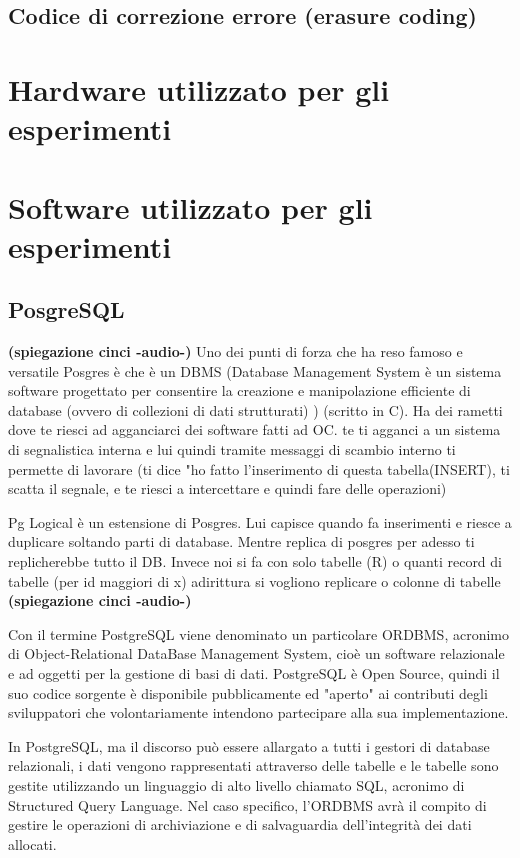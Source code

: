 \subsection{Codice di correzione errore (erasure coding)}
\item
\section{Hardware utilizzato per gli esperimenti}
\item
\section{Software utilizzato per gli esperimenti}
\item
\subsection{PosgreSQL}

\textbf{(spiegazione cinci -audio-)}
Uno dei punti di forza che ha reso famoso e versatile Posgres è che è un DBMS (Database Management System è un sistema software progettato per consentire la creazione e manipolazione efficiente di database (ovvero di collezioni di dati strutturati) ) (scritto in C). Ha dei rametti dove te riesci ad agganciarci dei software fatti ad OC. te ti agganci a un sistema di segnalistica interna e lui quindi tramite messaggi di scambio interno ti permette di lavorare (ti dice "ho fatto l'inserimento di questa tabella(INSERT), ti scatta il segnale, e te riesci a intercettare e quindi fare delle operazioni)

Pg Logical è un estensione di Posgres. Lui capisce quando fa inserimenti e riesce a duplicare soltando parti di database. Mentre replica di posgres per adesso ti replicherebbe tutto il DB. Invece noi si fa con solo tabelle (R) o quanti record di tabelle (per id maggiori di x) adirittura si vogliono replicare o colonne di tabelle \\
\textbf{(spiegazione cinci -audio-)}


Con il termine PostgreSQL viene denominato un particolare ORDBMS, acronimo di Object-Relational DataBase Management System, cioè un software relazionale e ad oggetti per la gestione di basi di dati.
PostgreSQL è Open Source, quindi il suo codice sorgente è disponibile pubblicamente ed "aperto" ai contributi degli sviluppatori che volontariamente intendono partecipare alla sua implementazione.

In PostgreSQL, ma il discorso può essere allargato a tutti i gestori di database relazionali, i dati vengono rappresentati attraverso delle tabelle e le tabelle sono gestite utilizzando un linguaggio di alto livello chiamato SQL, acronimo di Structured Query Language.
Nel caso specifico, l'ORDBMS avrà il compito di gestire le operazioni di archiviazione e di salvaguardia dell'integrità dei dati allocati.

